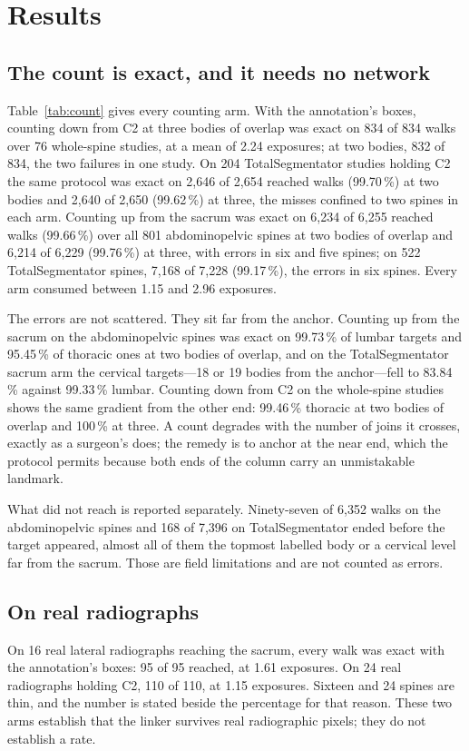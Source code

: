 \documentclass[11pt,letterpaper]{article}
\begin{document}
\section*{Results}

\subsection*{The count is exact, and it needs no network}
Table~\ref{tab:count} gives every counting arm. With the annotation's boxes, counting down from C2 at three
bodies of overlap was exact on 834 of 834 walks over 76 whole-spine studies, at a mean of 2.24 exposures;
at two bodies, 832 of 834, the two failures in one study. On 204 TotalSegmentator studies holding C2 the
same protocol was exact on 2,646 of 2,654 reached walks (99.70\,\%) at two bodies and 2,640 of 2,650
(99.62\,\%) at three, the misses confined to two spines in each arm. Counting up from the sacrum was exact
on 6,234 of 6,255 reached walks (99.66\,\%) over all 801 abdominopelvic spines at two bodies of overlap and
6,214 of 6,229 (99.76\,\%) at three, with errors in six and five spines; on 522 TotalSegmentator spines,
7,168 of 7,228 (99.17\,\%), the errors in six spines. Every arm consumed between 1.15 and 2.96 exposures.

The errors are not scattered. They sit far from the anchor. Counting up from the sacrum on the abdominopelvic
spines was exact on 99.73\,\% of lumbar targets and 95.45\,\% of thoracic ones at two bodies of overlap, and
on the TotalSegmentator sacrum arm the cervical targets---18 or 19 bodies from the anchor---fell to
83.84\,\% against 99.33\,\% lumbar. Counting down from C2 on the whole-spine studies shows the same
gradient from the other end: 99.46\,\% thoracic at two bodies of overlap and 100\,\% at three. A count degrades with the number of joins
it crosses, exactly as a surgeon's does; the remedy is to anchor at the near end, which the protocol permits
because both ends of the column carry an unmistakable landmark.

What did not reach is reported separately. Ninety-seven of 6,352 walks on the abdominopelvic spines and 168
of 7,396 on TotalSegmentator ended before the target appeared, almost all of them the topmost labelled body
or a cervical level far from the sacrum. Those are field limitations and are not counted as errors.

\subsection*{On real radiographs}
On 16 real lateral radiographs reaching the sacrum, every walk was exact with the annotation's boxes: 95 of
95 reached, at 1.61 exposures. On 24 real radiographs holding C2, 110 of 110, at 1.15 exposures. Sixteen and
24 spines are thin, and the number is stated beside the percentage for that reason. These two arms establish
that the linker survives real radiographic pixels; they do not establish a rate.
\end{document}
